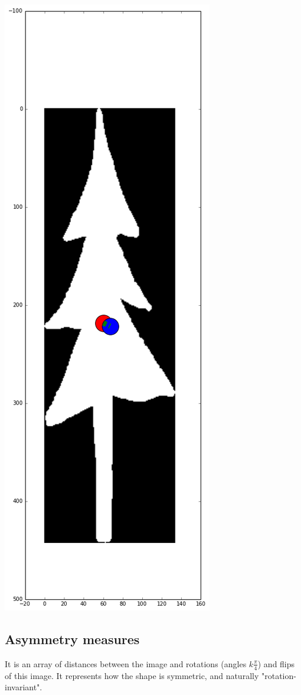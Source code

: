\documentclass[12pt]{article}
\begin{document}
\includegraphics[scale=0.26]{tree_centroid.png}


\subsection{Asymmetry measures}
It is an array of distances between the image and rotations (angles $k\frac{\pi}{4}$) and flips of this image. It represents how the shape is symmetric, and naturally "rotation-invariant".
\end{document}
